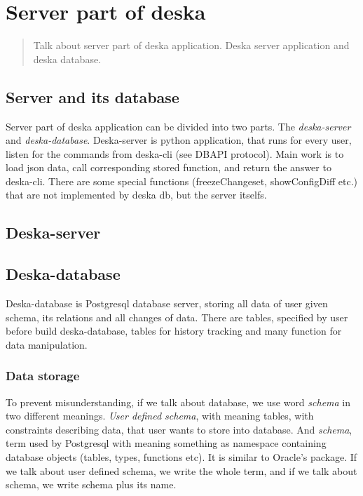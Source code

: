\documentclass[deska]{subfiles}
\begin{document}
\chapter{Server part of deska}
\label{sec:deska-server}

\begin{abstract}
Talk about server part of deska application. Deska server application and deska database.
\end{abstract}

\section{Server and its database}
Server part of deska application can be divided into two parts. The {\em deska-server} and {\em deska-database}.
Deska-server is python application, that runs for every user, listen for the commands from deska-cli (see DBAPI protocol).
Main work is to load json data, call corresponding stored function, and return the answer to deska-cli.
There are some special functions (freezeChangeset, showConfigDiff etc.) that are not implemented by deska db, but the server itselfs.

\section{Deska-server}

\section{Deska-database}
Deska-database is Postgresql database server, storing all data of user given schema, its relations and all changes of data.
There are tables, specified by user before build deska-database, tables for history tracking and many function for data manipulation.

\subsection{Data storage}
To prevent misunderstanding, if we talk about database, we use word {\em schema} in two different meanings. {\em User defined schema},
with meaning tables, with constraints describing data, that user wants to store into database. And {\em schema}, term used by
Postgresql with meaning something as namespace containing database objects (tables, types, functions etc).
It is similar to Oracle's package. If we talk about user defined schema, we write the whole term, and if we talk about schema, we write
schema plus its name.
\end{document}
